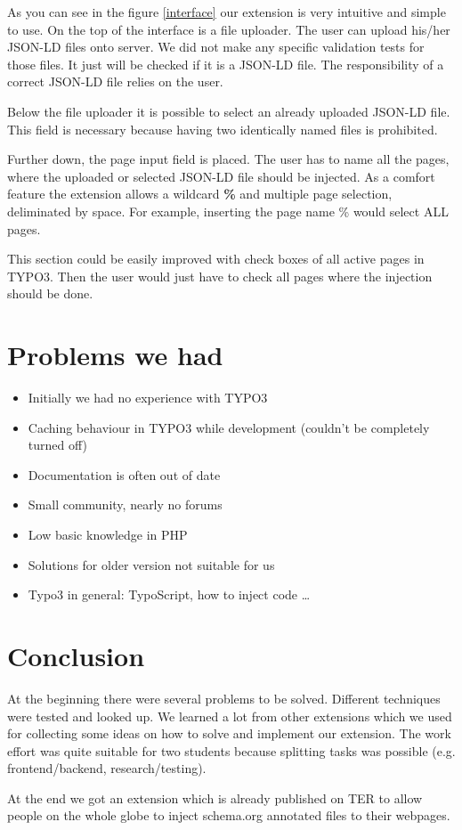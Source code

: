 \documentclass[12pt]{article}
\begin{document}
As you can see in the figure \ref{interface} our extension is very intuitive and simple to use. On the top of the interface is a file uploader. The user can upload his/her JSON-LD files onto server. We did not make any specific validation tests for those files. It just will be checked if it is a JSON-LD file. The responsibility of a correct JSON-LD file relies on the user.

Below the file uploader it is possible to select an already uploaded JSON-LD file. This field is necessary because having two identically named files is prohibited.

Further down, the page input field is placed. The user has to name all the pages, where the uploaded or selected JSON-LD file should be injected. As a comfort feature the extension allows a wildcard \textbf{\%} and multiple page selection, deliminated by space. For example, inserting the page name \% would select ALL pages.

This section could be easily improved with check boxes of all active pages in TYPO3. Then the user would just have to check all pages where the injection should be done.


\section{Problems we had}
\begin{itemize}
	\item Initially we had no experience with TYPO3
	\item Caching behaviour in TYPO3 while development (couldn't be completely turned off)
	\item Documentation is often out of date
	\item Small community, nearly no forums
	\item Low basic knowledge in PHP
	\item Solutions for older version not suitable for us
	\item Typo3 in general: TypoScript, how to inject code \dots
\end{itemize}

\section{Conclusion}

At the beginning there were several problems to be solved. Different techniques were tested and looked up. We learned a lot from other extensions which we used for collecting some ideas on how to solve and implement our extension. The work effort was quite suitable for two students because splitting tasks was possible (e.g. frontend/backend, research/testing).

At the end we got an extension which is already published on TER to allow people on the whole globe to inject schema.org annotated files to their webpages. 
\end{document}
